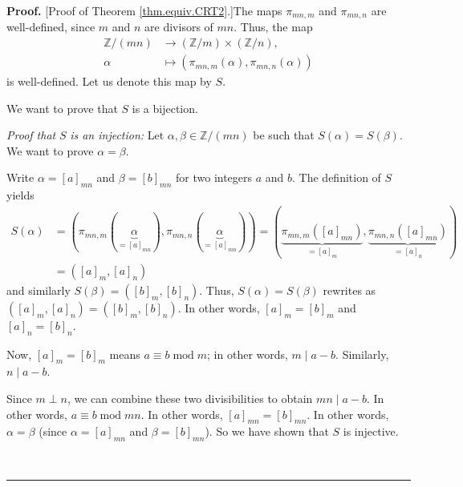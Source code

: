 \documentclass[numbers=enddot,12pt,final,onecolumn,notitlepage]{scrartcl}%
\numberwithin{exer}{subsection}
\theoremstyle{definition}
\newenvironment{proof}[1][Proof]{\noindent\textbf{#1.} }{\ \rule{0.5em}{0.5em}}
\begin{document}
\begin{proof}
[Proof of Theorem \ref{thm.equiv.CRT2}.]The maps $\pi_{mn,m}$ and $\pi_{mn,n}$
are well-defined, since $m$ and $n$ are divisors of $mn$. Thus, the map%
\begin{align*}
\mathbb{Z}/\left(  mn\right)   &  \rightarrow\left(  \mathbb{Z}/m\right)
\times\left(  \mathbb{Z}/n\right)  ,\\
\alpha &  \mapsto\left(  \pi_{mn,m}\left(  \alpha\right)  ,\pi_{mn,n}\left(
\alpha\right)  \right)
\end{align*}
is well-defined. Let us denote this map by $S$.

We want to prove that $S$ is a bijection.

\textit{Proof that }$S$ \textit{is an injection:} Let $\alpha,\beta
\in\mathbb{Z}/\left(  mn\right)  $ be such that $S\left(  \alpha\right)
=S\left(  \beta\right)  $. We want to prove $\alpha=\beta$.

Write $\alpha=\left[  a\right]  _{mn}$ and $\beta=\left[  b\right]  _{mn}$ for
two integers $a$ and $b$. The definition of $S$ yields
\begin{align*}
S\left(  \alpha\right)   &  =\left(  \pi_{mn,m}\left(  \underbrace{\alpha
}_{=\left[  a\right]  _{mn}}\right)  ,\pi_{mn,n}\left(  \underbrace{\alpha
}_{=\left[  a\right]  _{mn}}\right)  \right)  =\left(  \underbrace{\pi
_{mn,m}\left(  \left[  a\right]  _{mn}\right)  }_{=\left[  a\right]  _{m}%
},\underbrace{\pi_{mn,n}\left(  \left[  a\right]  _{mn}\right)  }_{=\left[
a\right]  _{n}}\right) \\
&  =\left(  \left[  a\right]  _{m},\left[  a\right]  _{n}\right)
\end{align*}
and similarly $S\left(  \beta\right)  =\left(  \left[  b\right]  _{m},\left[
b\right]  _{n}\right)  $. Thus, $S\left(  \alpha\right)  =S\left(
\beta\right)  $ rewrites as $\left(  \left[  a\right]  _{m},\left[  a\right]
_{n}\right)  =\left(  \left[  b\right]  _{m},\left[  b\right]  _{n}\right)  $.
In other words, $\left[  a\right]  _{m}=\left[  b\right]  _{m}$ and $\left[
a\right]  _{n}=\left[  b\right]  _{n}$.

Now, $\left[  a\right]  _{m}=\left[  b\right]  _{m}$ means $a\equiv
b\operatorname{mod}m$; in other words, $m\mid a-b$. Similarly, $n\mid a-b$.

Since $m\perp n$, we can combine these two divisibilities to obtain $mn\mid
a-b$. In other words, $a\equiv b\operatorname{mod}mn$. In other words,
$\left[  a\right]  _{mn}=\left[  b\right]  _{mn}$. In other words,
$\alpha=\beta$ (since $\alpha=\left[  a\right]  _{mn}$ and $\beta=\left[
b\right]  _{mn}$). So we have shown that $S$ is injective.


\end{proof}
\end{document}

